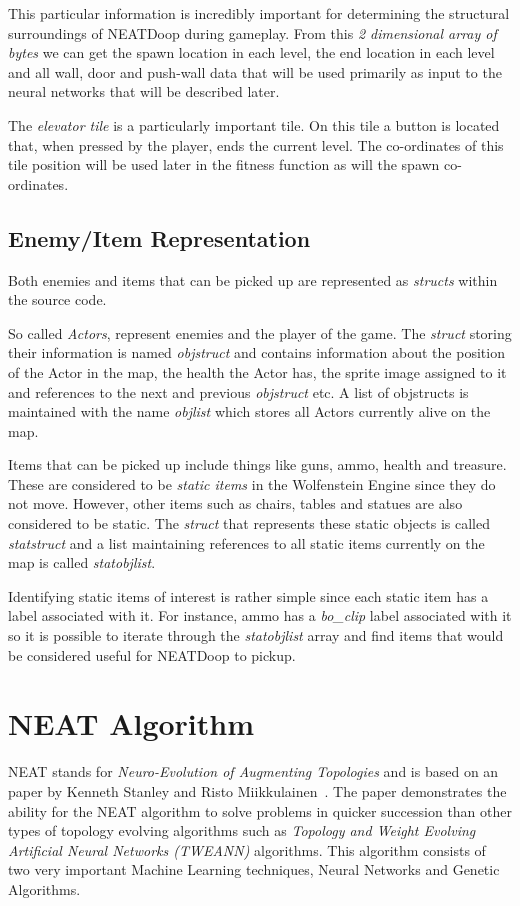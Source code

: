 \documentclass[]{Learning-to-Play-Wolfenstein-thesis}
\begin{document}
This particular information is incredibly important for determining the structural surroundings of NEATDoop during gameplay. From this \textit{2 dimensional array of bytes} we can get the spawn location in each level, the end location in each level and all wall, door and push-wall data that will be used primarily as input to the neural networks that will be described later. 

The \textit{elevator tile} is a particularly important tile. On this tile a button is located that, when pressed by the player, ends the current level. The co-ordinates of this tile position will be used later in the fitness function as will the spawn co-ordinates. 

\subsection{Enemy/Item Representation}
Both enemies and items that can be picked up are represented as \textit{structs} within the source code. 

So called \textit{Actors}, represent enemies and the player of the game. The \textit{struct} storing their information is named \textit{objstruct} and contains information about the position of the Actor in the map, the health the Actor has, the sprite image assigned to it and references to the next and previous \textit{objstruct} etc. A list of objstructs is maintained with the name \textit{objlist} which stores all Actors currently alive on the map.

Items that can be picked up include things like guns, ammo, health and treasure. These are considered to be \textit{static items} in the Wolfenstein Engine since they do not move. However, other items such as chairs, tables and statues are also considered to be static. The \textit{struct} that represents these static objects is called \textit{statstruct} and a list maintaining references to all static items currently on the map is called \textit{statobjlist}.

Identifying static items of interest is rather simple since each static item has a label associated with it. For instance, ammo has a \textit{bo\_clip} label associated with it so it is possible to iterate through the \textit{statobjlist} array and find items that would be considered useful for NEATDoop to pickup. 

\section{NEAT Algorithm}
NEAT stands for \textit{Neuro-Evolution of Augmenting Topologies} and is based on an paper by Kenneth Stanley and Risto Miikkulainen~\cite{NEAT:2002}. The paper demonstrates the ability for the NEAT algorithm to solve problems in quicker succession than other types of topology evolving algorithms such as \textit{Topology and Weight Evolving Artificial Neural Networks (TWEANN)} algorithms. This algorithm consists of two very important Machine Learning techniques, Neural Networks and Genetic Algorithms.\\\\
\end{document}
